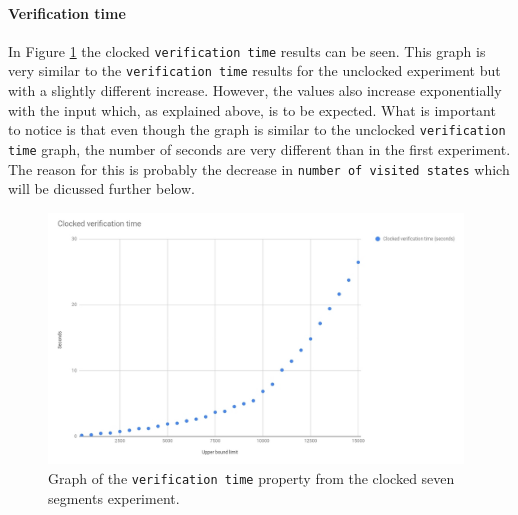 \paragraph{Verification time}
In Figure \ref{fig:clocked_verification} the clocked \texttt{verification time}
results can be seen.
This graph is very similar to the \texttt{verification time} results for the unclocked experiment but with a slightly different increase. However, the values also increase exponentially with the input which, as explained above, is to be expected. What is important to notice is that even though the graph is similar to the unclocked \texttt{verification time} graph, the number of seconds are very different than in the first experiment. The reason for this is probably the decrease in \texttt{number of visited states} which will be dicussed further below.
\begin{figure}
    \includegraphics[width=0.98\textwidth]{./figures/temporary_graphs/clocked_verification_time.jpg}
\caption{Graph of the \texttt{verification time} property from the clocked seven segments experiment.}
\label{fig:clocked_verification}
\end{figure}
